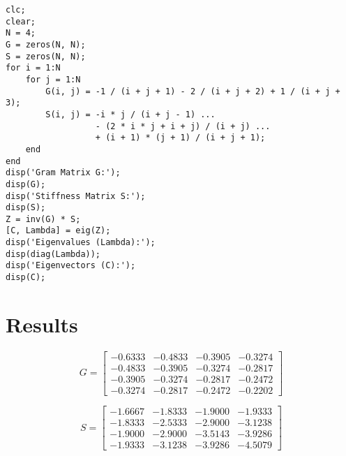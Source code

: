 \documentclass{article}
\begin{document}

\begin{tcolorbox}[title=Galerkin Method MATLAB Code]
\begin{lstlisting}
clc;
clear;
N = 4;
G = zeros(N, N);
S = zeros(N, N);
for i = 1:N
    for j = 1:N
        G(i, j) = -1 / (i + j + 1) - 2 / (i + j + 2) + 1 / (i + j + 3);
        S(i, j) = -i * j / (i + j - 1) ...
                  - (2 * i * j + i + j) / (i + j) ...
                  + (i + 1) * (j + 1) / (i + j + 1);
    end
end
disp('Gram Matrix G:');
disp(G);
disp('Stiffness Matrix S:');
disp(S);
Z = inv(G) * S;
[C, Lambda] = eig(Z);
disp('Eigenvalues (Lambda):');
disp(diag(Lambda));
disp('Eigenvectors (C):');
disp(C);
\end{lstlisting}
\end{tcolorbox}

\section*{Results}

\begin{tcolorbox}[title=Gram Matrix $G$]
\[
G =
\begin{bmatrix}
-0.6333 & -0.4833 & -0.3905 & -0.3274 \\
-0.4833 & -0.3905 & -0.3274 & -0.2817 \\
-0.3905 & -0.3274 & -0.2817 & -0.2472 \\
-0.3274 & -0.2817 & -0.2472 & -0.2202
\end{bmatrix}
\]
\end{tcolorbox}

\vspace{0.5cm}

\begin{tcolorbox}[title=Stiffness Matrix $S$]
\[
S =
\begin{bmatrix}
-1.6667 & -1.8333 & -1.9000 & -1.9333 \\
-1.8333 & -2.5333 & -2.9000 & -3.1238 \\
-1.9000 & -2.9000 & -3.5143 & -3.9286 \\
-1.9333 & -3.1238 & -3.9286 & -4.5079
\end{bmatrix}
\]
\end{tcolorbox}
\end{document}
